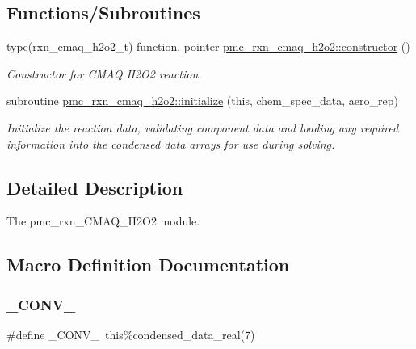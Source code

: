 \subsection*{Functions/\+Subroutines}
\begin{DoxyCompactItemize}
\item 
type(rxn\+\_\+cmaq\+\_\+h2o2\+\_\+t) function, pointer \mbox{\hyperlink{namespacepmc__rxn__cmaq__h2o2_aa4313a0f6cbaa981af9bb374696eb4a5}{pmc\+\_\+rxn\+\_\+cmaq\+\_\+h2o2\+::constructor}} ()
\begin{DoxyCompactList}\small\item\em Constructor for C\+M\+AQ H2\+O2 reaction. \end{DoxyCompactList}\item 
subroutine \mbox{\hyperlink{namespacepmc__rxn__cmaq__h2o2_ac9b479994bd896861267eb07f73efdff}{pmc\+\_\+rxn\+\_\+cmaq\+\_\+h2o2\+::initialize}} (this, chem\+\_\+spec\+\_\+data, aero\+\_\+rep)
\begin{DoxyCompactList}\small\item\em Initialize the reaction data, validating component data and loading any required information into the condensed data arrays for use during solving. \end{DoxyCompactList}\end{DoxyCompactItemize}


\subsection{Detailed Description}
The pmc\+\_\+rxn\+\_\+\+C\+M\+A\+Q\+\_\+\+H2\+O2 module. 



\subsection{Macro Definition Documentation}
\mbox{\label{rxn___c_m_a_q___h2_o2_8_f90_a8d22506f8671e195690022c44d319caf}} 
\subsubsection{\texorpdfstring{\+\_\+\+C\+O\+N\+V\+\_\+}{\_CONV\_}}
{\footnotesize\ttfamily \#define \+\_\+\+C\+O\+N\+V\+\_\+~this\%condensed\+\_\+data\+\_\+real(7)}

